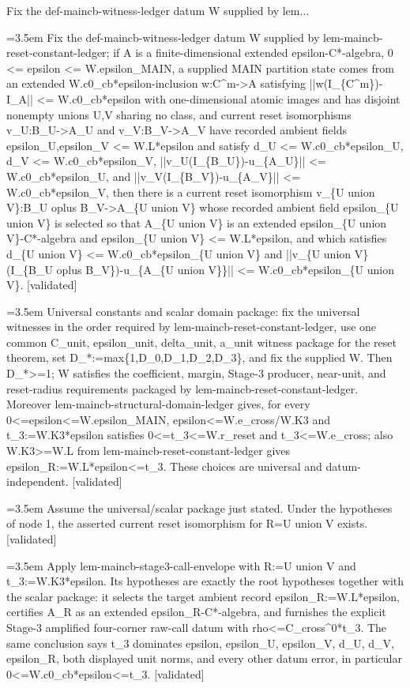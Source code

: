 \documentclass{article}
\newcommand{\step}[1]{\par\noindent\hangindent=3.5em\hangafter=1%
  \makebox[3.5em][l]{\textbf{#1.}}}
\newcommand{\steptag}[1]{\hfill{\small\textsf{[#1]}}}
\begin{document}
\begin{proofbox}{Fix the def-maincb-witness-ledger datum W supplied by lem...}
\step{1} Fix the def-maincb-witness-ledger datum W supplied by lem-maincb-reset-constant-ledger; if A is a finite-dimensional extended epsilon-C*-algebra, 0 <= epsilon <= W.epsilon\_MAIN, a supplied MAIN partition state comes from an extended W.c0\_cb*epsilon-inclusion w:C\textasciicircum{}m->A satisfying ||w(I\_\{C\textasciicircum{}m\})-I\_A|| <= W.c0\_cb*epsilon with one-dimensional atomic images and has disjoint nonempty unions U,V sharing no class, and current reset isomorphisms v\_U:B\_U->A\_U and v\_V:B\_V->A\_V have recorded ambient fields epsilon\_U,epsilon\_V <= W.L*epsilon and satisfy d\_U <= W.c0\_cb*epsilon\_U, d\_V <= W.c0\_cb*epsilon\_V, ||v\_U(I\_\{B\_U\})-u\_\{A\_U\}|| <= W.c0\_cb*epsilon\_U, and ||v\_V(I\_\{B\_V\})-u\_\{A\_V\}|| <= W.c0\_cb*epsilon\_V, then there is a current reset isomorphism v\_\{U union V\}:B\_U oplus B\_V->A\_\{U union V\} whose recorded ambient field epsilon\_\{U union V\} is selected so that A\_\{U union V\} is an extended epsilon\_\{U union V\}-C*-algebra and epsilon\_\{U union V\} <= W.L*epsilon, and which satisfies d\_\{U union V\} <= W.c0\_cb*epsilon\_\{U union V\} and ||v\_\{U union V\}(I\_\{B\_U oplus B\_V\})-u\_\{A\_\{U union V\}\}|| <= W.c0\_cb*epsilon\_\{U union V\}. \steptag{validated} \\[6pt]
\step{1.1} Universal constants and scalar domain package: fix the universal witnesses in the order required by lem-maincb-reset-constant-ledger, use one common C\_unit, epsilon\_unit, delta\_unit, a\_unit witness package for the reset theorem, set D\_*:=max\{1,D\_0,D\_1,D\_2,D\_3\}, and fix the supplied W. Then D\_*>=1; W satisfies the coefficient, margin, Stage-3 producer, near-unit, and reset-radius requirements packaged by lem-maincb-reset-constant-ledger. Moreover lem-maincb-structural-domain-ledger gives, for every 0<=epsilon<=W.epsilon\_MAIN, epsilon<=W.e\_cross/W.K3 and t\_3:=W.K3*epsilon satisfies 0<=t\_3<=W.r\_reset and t\_3<=W.e\_cross; also W.K3>=W.L from lem-maincb-reset-constant-ledger gives epsilon\_R:=W.L*epsilon<=t\_3. These choices are universal and datum-independent. \steptag{validated} \\[4pt]
\step{1.2} Assume the universal/scalar package just stated. Under the hypotheses of node 1, the asserted current reset isomorphism for R=U union V exists. \steptag{validated} \\[6pt]
\step{1.2.1} Apply lem-maincb-stage3-call-envelope with R:=U union V and t\_3:=W.K3*epsilon. Its hypotheses are exactly the root hypotheses together with the scalar package: it selects the target ambient record epsilon\_R:=W.L*epsilon, certifies A\_R as an extended epsilon\_R-C*-algebra, and furnishes the explicit Stage-3 amplified four-corner raw-call datum with rho<=C\_cross\textasciicircum{}0*t\_3. The same conclusion says t\_3 dominates epsilon, epsilon\_U, epsilon\_V, d\_U, d\_V, epsilon\_R, both displayed unit norms, and every other datum error, in particular 0<=W.c0\_cb*epsilon<=t\_3. \steptag{validated} \\[4pt]

\end{proofbox}
\end{document}
